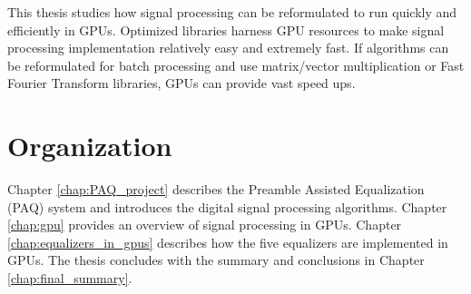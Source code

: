 This thesis studies how signal processing can be reformulated to run quickly and efficiently in GPUs.
Optimized libraries harness GPU resources to make signal processing implementation relatively easy and extremely fast.
If algorithms can be reformulated for batch processing and use matrix/vector multiplication or Fast Fourier Transform libraries, GPUs can provide vast speed ups.

\section{Organization}
Chapter \ref{chap:PAQ_project} describes the Preamble Assisted Equalization (PAQ) system and introduces the digital signal processing algorithms.
Chapter \ref{chap:gpu} provides an overview of signal processing in GPUs.
Chapter \ref{chap:equalizers_in_gpus} describes how the five equalizers are implemented in GPUs.
The thesis concludes with the summary and conclusions in Chapter \ref{chap:final_summary}.